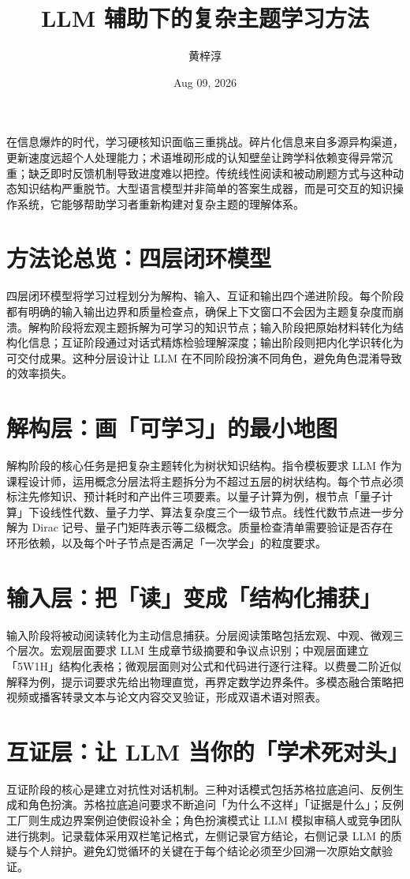 \title{LLM 辅助下的复杂主题学习方法}
\author{黄梓淳}
\date{Aug 09, 2026}
\maketitle
在信息爆炸的时代，学习硬核知识面临三重挑战。碎片化信息来自多源异构渠道，更新速度远超个人处理能力；术语堆砌形成的认知壁垒让跨学科依赖变得异常沉重；缺乏即时反馈机制导致进度难以把控。传统线性阅读和被动刷题方式与这种动态知识结构严重脱节。大型语言模型并非简单的答案生成器，而是可交互的知识操作系统，它能够帮助学习者重新构建对复杂主题的理解体系。\par
\chapter{方法论总览：四层闭环模型}
四层闭环模型将学习过程划分为解构、输入、互证和输出四个递进阶段。每个阶段都有明确的输入输出边界和质量检查点，确保上下文窗口不会因为主题复杂度而崩溃。解构阶段将宏观主题拆解为可学习的知识节点；输入阶段把原始材料转化为结构化信息；互证阶段通过对话式精炼检验理解深度；输出阶段则把内化学识转化为可交付成果。这种分层设计让 LLM 在不同阶段扮演不同角色，避免角色混淆导致的效率损失。\par
\chapter{解构层：画「可学习」的最小地图}
解构阶段的核心任务是把复杂主题转化为树状知识结构。指令模板要求 LLM 作为课程设计师，运用概念分层法将主题拆分为不超过五层的树状结构。每个节点必须标注先修知识、预计耗时和产出件三项要素。以量子计算为例，根节点「量子计算」下设线性代数、量子力学、算法复杂度三个一级节点。线性代数节点进一步分解为 Dirac 记号、量子门矩阵表示等二级概念。质量检查清单需要验证是否存在环形依赖，以及每个叶子节点是否满足「一次学会」的粒度要求。\par
\chapter{输入层：把「读」变成「结构化捕获」}
输入阶段将被动阅读转化为主动信息捕获。分层阅读策略包括宏观、中观、微观三个层次。宏观层面要求 LLM 生成章节级摘要和争议点识别；中观层面建立「5W1H」结构化表格；微观层面则对公式和代码进行逐行注释。以费曼二阶近似解释为例，提示词要求先给出物理直觉，再界定数学边界条件。多模态融合策略把视频或播客转录文本与论文内容交叉验证，形成双语术语对照表。\par
\chapter{互证层：让 LLM 当你的「学术死对头」}
互证阶段的核心是建立对抗性对话机制。三种对话模式包括苏格拉底追问、反例生成和角色扮演。苏格拉底追问要求不断追问「为什么不这样」「证据是什么」；反例工厂则生成边界案例迫使假设补全；角色扮演模式让 LLM 模拟审稿人或竞争团队进行挑刺。记录载体采用双栏笔记格式，左侧记录官方结论，右侧记录 LLM 的质疑与个人辩护。避免幻觉循环的关键在于每个结论必须至少回溯一次原始文献验证。\par
